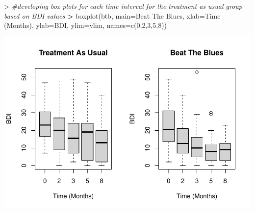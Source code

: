 \documentclass[
]{article}
\newenvironment{Shaded}{\begin{snugshade}}{\end{snugshade}}
\newcommand{\AttributeTok}[1]{\textcolor[rgb]{0.77,0.63,0.00}{#1}}
\newcommand{\CommentTok}[1]{\textcolor[rgb]{0.56,0.35,0.01}{\textit{#1}}}
\newcommand{\DecValTok}[1]{\textcolor[rgb]{0.00,0.00,0.81}{#1}}
\newcommand{\ErrorTok}[1]{\textcolor[rgb]{0.64,0.00,0.00}{\textbf{#1}}}
\newcommand{\FunctionTok}[1]{\textcolor[rgb]{0.00,0.00,0.00}{#1}}
\newcommand{\NormalTok}[1]{#1}
\newcommand{\SpecialCharTok}[1]{\textcolor[rgb]{0.00,0.00,0.00}{#1}}
\newcommand{\StringTok}[1]{\textcolor[rgb]{0.31,0.60,0.02}{#1}}
\begin{document}
\begin{Shaded}
\begin{Highlighting}[]
\SpecialCharTok{\textgreater{}} \CommentTok{\#developing box plots for each time interval for the treatment as usual group based on BDI values}
\ErrorTok{\textgreater{}} \FunctionTok{boxplot}\NormalTok{(btb, }\AttributeTok{main=}\StringTok{\textquotesingle{}Beat The Blues\textquotesingle{}}\NormalTok{, }\AttributeTok{xlab=}\StringTok{\textquotesingle{}Time (Months)\textquotesingle{}}\NormalTok{, }\AttributeTok{ylab=}\StringTok{\textquotesingle{}BDI\textquotesingle{}}\NormalTok{, }\AttributeTok{ylim=}\NormalTok{ylim, }\AttributeTok{names=}\FunctionTok{c}\NormalTok{(}\DecValTok{0}\NormalTok{,}\DecValTok{2}\NormalTok{,}\DecValTok{3}\NormalTok{,}\DecValTok{5}\NormalTok{,}\DecValTok{8}\NormalTok{))}
\end{Highlighting}
\end{Shaded}

\includegraphics{HUDM6122-Homework_10-Chenguang-Pan_files/figure-latex/unnamed-chunk-10-1.pdf}
\end{document}
